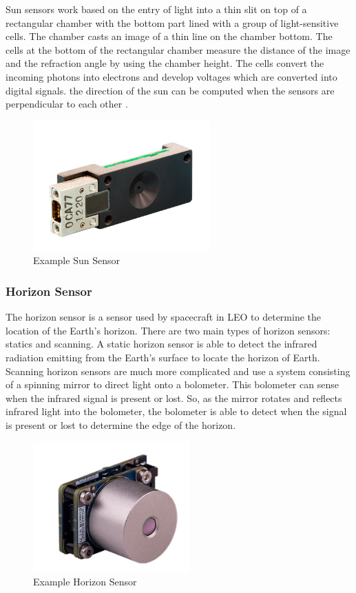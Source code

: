 Sun sensors work based on the entry of light into a thin slit on top
of a rectangular chamber with the bottom part lined with a group of
light-sensitive cells. The chamber casts an image of a thin line on
the chamber bottom. The cells at the bottom of the rectangular chamber
measure the distance of the image and the refraction angle by using
the chamber height. The cells convert the incoming photons into
electrons and develop voltages which are converted into digital
signals. the direction of the sun can be computed when the sensors are
perpendicular to each other \cite{qp31}.
\begin{figure}[H]
  \begin{center}
  \includegraphics[height=50mm]{Figures/SunSensor}
  \end{center}
  \caption{Example Sun Sensor \cite{qp32}}
\end{figure}

\subsubsection{Horizon Sensor}

The horizon sensor is a sensor used by spacecraft in LEO to determine
the location of the Earth’s horizon. There are two main types of
horizon sensors: statics and scanning. A static horizon sensor is able
to detect the infrared radiation emitting from the Earth’s surface to
locate the horizon of Earth. Scanning horizon sensors are much more
complicated and use a system consisting of a spinning mirror to direct
light onto a bolometer. This bolometer can sense when the infrared
signal is present or lost. So, as the mirror rotates and reflects
infrared light into the bolometer, the bolometer is able to detect
when the signal is present or lost to determine the edge of the
horizon\cite{qp37}.  
\begin{figure}[H]
  \begin{center}
  \includegraphics[height=50mm]{Figures/HorizonSensor}
  \end{center}
  \caption{Example Horizon Sensor \cite{qp1}}
\end{figure}

